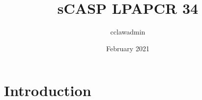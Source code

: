 \documentclass{article}
\title{sCASP LPAPCR 34}
\author{cclawadmin }
\date{February 2021}
\begin{document}
\maketitle

\section{Introduction}
\end{document}
